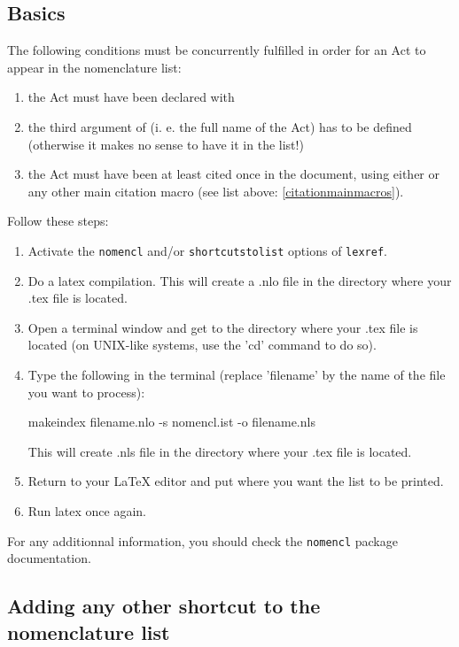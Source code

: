 \documentclass[a4paper]{ltxdockit}[2011/03/25]
\newcommand{\lexref}{\texttt{lexref}\xspace}
\newcommand{\variable}[1]{$\langle$\textsl{#1}$\rangle$}
\begin{document}
\subsection{Basics}

The following conditions must be concurrently fulfilled in order for an Act to appear in the nomenclature list:
\begin{enumerate}
\item the Act must have been declared with 
\item the third argument of  (i. e. the full name of the Act) has to be defined (otherwise it makes no sense to have it in the list!)
\item the Act must have been at least cited once in the document, using either \cs{\variable{Act's macro}} or any other main citation macro (see list above: \ref{citationmainmacros}).
\end{enumerate}

Follow these steps:
\begin{enumerate}
\item Activate the \texttt{nomencl} and/or \texttt{shortcutstolist} options of \lexref.
\item Do a latex compilation. This will create a .nlo file in the directory where your .tex file is located.
\item Open a terminal window and get to the directory where your .tex file is located (on UNIX-like systems, use the 'cd' command to do so).
\item Type the following in the terminal (replace 'filename' by the name of the file you want to process):
\begin{ltxcode}
makeindex filename.nlo -s nomencl.ist -o filename.nls
\end{ltxcode} 

This will create .nls file in the directory where your .tex file is located. 
\item Return to your \LaTeX{} editor and put  where you want the list to be printed.
\item Run latex once again.
\end{enumerate}

For any additionnal information, you should check the \texttt{nomencl} package documentation.



\subsection{Adding any other shortcut to the nomenclature list}
\end{document}
